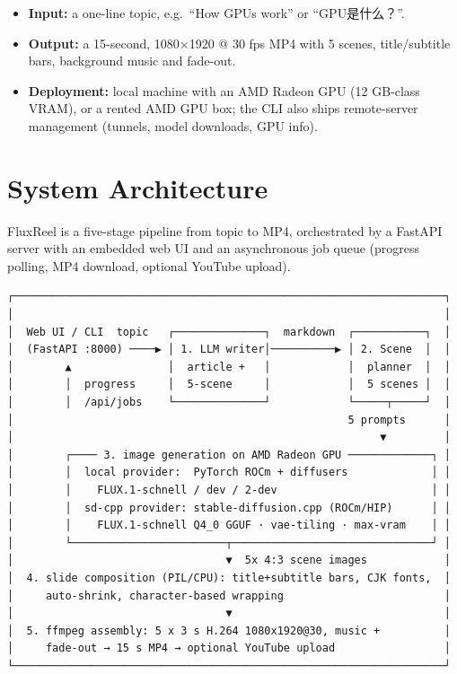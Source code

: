 \documentclass[UTF8,fontset=mac,a4paper,11pt]{ctexart}
\begin{document}
\begin{itemize}
  \item \textbf{Input:} a one-line topic, e.g.\ ``How GPUs work'' or
        ``GPU是什么？''.
  \item \textbf{Output:} a 15-second, 1080×1920 @ 30 fps MP4 with 5
        scenes, title/subtitle bars, background music and fade-out.
  \item \textbf{Deployment:} local machine with an AMD Radeon GPU
        (12 GB-class VRAM), or a rented AMD GPU box; the CLI also ships
        remote-server management (tunnels, model downloads, GPU info).
\end{itemize}

\section{System Architecture}

FluxReel is a five-stage pipeline from topic to MP4, orchestrated by a
FastAPI server with an embedded web UI and an asynchronous job queue
(progress polling, MP4 download, optional YouTube upload).

\begin{lstlisting}
┌───────────────────────────────────────────────────────────────────┐
│                                                                   │
│  Web UI / CLI  topic   ┌──────────────┐  markdown  ┌───────────┐  │
│  (FastAPI :8000) ────▶ │ 1. LLM writer│──────────▶ │ 2. Scene  │  │
│        ▲               │  article +   │            │  planner  │  │
│        │  progress     │  5-scene     │            │  5 scenes │  │
│        │  /api/jobs    └──────────────┘            └─────┬─────┘  │
│                                                    5 prompts      │
│                                                         ▼         │
│        ┌──── 3. image generation on AMD Radeon GPU ─────────────┐ │
│        │  local provider:  PyTorch ROCm + diffusers             │ │
│        │    FLUX.1-schnell / dev / 2-dev                        │ │
│        │  sd-cpp provider: stable-diffusion.cpp (ROCm/HIP)      │ │
│        │    FLUX.1-schnell Q4_0 GGUF · vae-tiling · max-vram    │ │
│        └────────────────────────┬───────────────────────────────┘ │
│                                 ▼  5x 4:3 scene images            │
│  4. slide composition (PIL/CPU): title+subtitle bars, CJK fonts,  │
│     auto-shrink, character-based wrapping                         │
│                                 ▼                                 │
│  5. ffmpeg assembly: 5 x 3 s H.264 1080x1920@30, music +          │
│     fade-out → 15 s MP4 → optional YouTube upload                 │
└───────────────────────────────────────────────────────────────────┘
\end{lstlisting}
\end{document}
